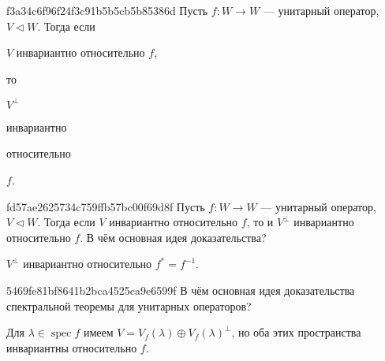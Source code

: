 \begin{note}{f3a34c6f96f24f3c91b5b5cb5b85386d}
    Пусть \({ f : W \to W }\) --- унитарный оператор, \({ V \triangleleft W }\).
    Тогда если \begin{icloze}{4}\({ V }\) инвариантно относительно \({ f }\),\end{icloze} то \begin{icloze}{1}\({ V^{\perp} }\)\end{icloze} \begin{icloze}{3}инвариантно\end{icloze} относительно \begin{icloze}{2}\({ f }\).\end{icloze}
\end{note}

\begin{note}{fd57ae2625734c759ffb57bc00f69d8f}
    Пусть \({ f : W \to W }\) --- унитарный оператор, \({ V \triangleleft W }\).
    Тогда если \({ V }\) инвариантно относительно \({ f }\),  то и \({ V^{\perp} }\) инвариантно относительно \({ f }\).
    В чём основная идея доказательства?

    \begin{cloze}{1}
        \({ V^{\perp} }\) инвариантно относительно \({ f^* = f^{-1} }\).
    \end{cloze}
\end{note}


\begin{note}{5469fe81bf8641b2bca4525ca9e6599f}
    В чём основная идея доказательства спектральной теоремы для унитарных операторов?

    \begin{cloze}{1}
        Для \({ \lambda \in \operatorname{spec} f }\) имеем \({ V = V_f(\lambda) \oplus V_f(\lambda)^{\perp} }\), но оба этих пространства инвариантны относительно \({ f }\).
    \end{cloze}
\end{note}

